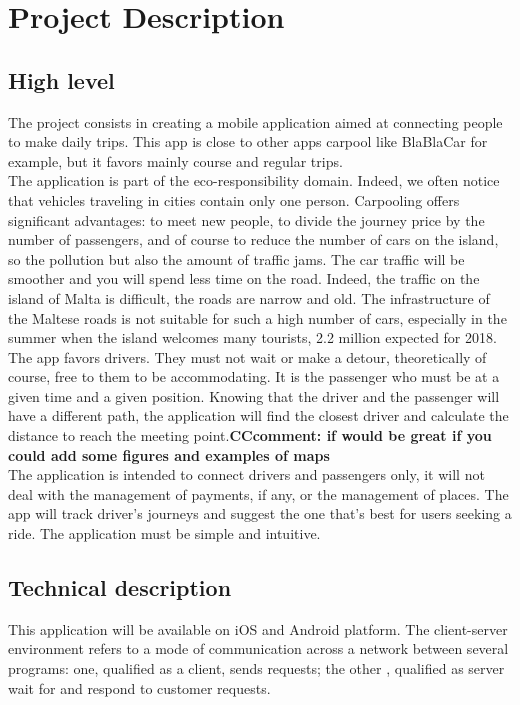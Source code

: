 \part{Project Description}

\chapter{High level}
The project consists in creating a mobile application aimed at connecting people to make daily trips. This app is close to other apps carpool like BlaBlaCar for example, but it favors mainly course and regular trips.
\\The application is part of the eco-responsibility domain. Indeed, we often notice that vehicles traveling in cities contain only one person. Carpooling offers significant advantages: to meet new people, to divide the journey price by the number of passengers, and of course to reduce the number of cars on the island, so the pollution but also the amount of traffic jams. The car traffic will be smoother and you will spend less time on the road. Indeed, the traffic on the island of Malta is difficult, the roads are narrow and old. The infrastructure of the Maltese roads is not suitable for such a high number of cars, especially in the summer when the island welcomes many tourists, 2.2 million expected for 2018.
\\The app favors drivers. They must not wait or make a detour, theoretically of course, free to them to be accommodating. It is the passenger who must be at a given time and a given position. Knowing that the driver and the passenger will have a different path, the application will find the closest driver and calculate the distance to reach the meeting point.{\bf CCcomment: if would be great if you could add some figures and examples of maps}
\\The application is intended to connect drivers and passengers only, it will not deal with the management of payments, if any, or the management of places. The app will track driver's journeys and suggest the one that's best for users seeking a ride. The application must be simple and intuitive.

\chapter{Technical description}
This application will be available on iOS and Android platform. The client-server environment refers to a mode of communication across a network between several programs: one, qualified as a client, sends requests; the other , qualified as server wait for and respond to customer requests.

